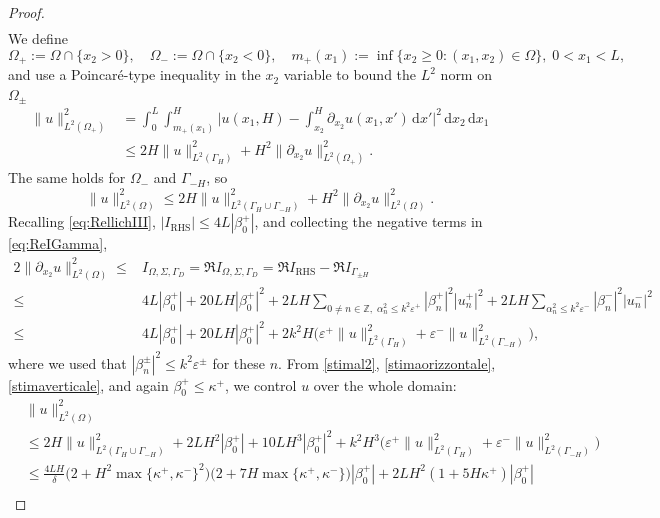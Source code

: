 \documentclass[a4paper,10pt]{article}
\newcommand{\IZ}{{\mathbb Z}}
\newcommand{\rd}{{\,\mathrm d}}
\newcommand{\dxt}{{\partial_{x_2}}}
\newcommand{\GD}{{\Gamma_D}}
\newcommand{\GH}{{\Gamma_H}}
\newcommand{\GmH}{{\Gamma_{-H}}}
\newcommand{\GpmH}{{\Gamma_{\pm H}}}
\begin{document}
\begin{proof}
\begin{align}
	\label{stimaorizzontale}
\end{align}
We define 
\begin{equation*}
	\Omega_+:=\Omega\cap\{x_2>0\}, \quad
	\Omega_-:=\Omega\cap\{x_2<0\}, \quad
	m_+(x_1):=\inf\{x_2\ge 0: (x_1,x_2)\in\Omega\}, \; 0<x_1<L,
\end{equation*}
and use 
a Poincaré-type inequality 
in the $x_2$ variable 
to bound the $L^2$ norm on $\Omega_\pm$
\begin{align*}
	\|u\|_{L^2(\Omega_+)}^2 & =
	\int_0^L\int_{m_+(x_1)}^H \bigg|u(x_1,H)-\int_{x_2}^H \dxt u(x_1,x')\rd x'\bigg|^2\rd x_2\rd x_1\\&
	\le 2H\|u\|_{L^2(\GH)}^2 + H^2\|\dxt u\|_{L^2(\Omega_+)}^2.
\end{align*}
The same holds for $\Omega_-$ and $\GmH$, so 
\begin{equation} \label{stimal2}
	\|u\|_{L^2(\Omega)}^2\le 2H\|u\|_{L^2(\GH\cup\GmH)}^2 + H^2\|\dxt u\|_{L^2(\Omega)}^2.
\end{equation}
Recalling \eqref{eq:RellichIII}, $|I_{\mathrm{RHS}}|\le 4L|\beta_0^+|$, and collecting the negative terms in \eqref{eq:ReIGamma},
\begin{align} \nonumber
	2\|\partial_{x_2}u\|^2_{L^2(\Omega)}
	\le&I_{\Omega, \Sigma, \GD}
	=\Re I_{\Omega, \Sigma, \GD}
	=\Re I_{\mathrm{RHS}}-\Re I_\GpmH
	\\ \nonumber
	\le &  
	4L|\beta_0^+| + 20 LH|\beta_0^+|^2 
	+2LH\!\!\sum_{0\ne n\in\IZ,\; \alpha_n^2\le k^2\varepsilon^+}|\beta_n^+|^2|u^+_n|^2 
	+2LH\sum_{\alpha_n^2\le k^2\varepsilon^-}|\beta_n^-|^2|u^-_n|^2 
	\\ \label{stimaverticale}
	\le& 4L|\beta_0^+| + 20 LH|\beta_0^+|^2 +
	2 k^2 H \Big(\varepsilon^+\|u\|_{L^2(\GH)}^2+\varepsilon^-\|u\|_{L^2(\GmH)}^2\Big)
	,\end{align}
where we used that $|\beta_n^\pm|^2\le k^2\varepsilon^\pm$ for these $n$.
From \eqref{stimal2}, \eqref{stimaorizzontale}, \eqref{stimaverticale}, and again $\beta_0^+\le\kappa^+$, we control $u$ over the whole domain:
\begin{align*} \nonumber
	&\|u\|_{L^2(\Omega)}^2\\ \nonumber
	&\le   2H\|u\|_{L^2(\GH\cup\GmH)}^2 
	+2LH^2|\beta_0^+| + 10 LH^3|\beta_0^+|^2 +
	k^2 H^3 \Big(\varepsilon^+\|u\|_{L^2(\GH)}^2+\varepsilon^-\|u\|_{L^2(\GmH)}^2\Big)
	\\ \nonumber
	&\le \frac{4LH}\delta\big(2+H^2\max\{\kappa^+,\kappa^-\}^2\big)\big(2+7H\max\{\kappa^+,\kappa^-\}\big)|\beta_0^+|
	+2LH^2(1+5H\kappa^+)|\beta_0^+|
	\\

\end{align*}
\end{proof}
\end{document}
